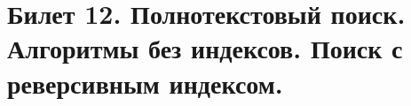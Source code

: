 \newpage
\section {Билет 12. Полнотекстовый поиск. Алгоритмы без индексов. Поиск с реверсивным индексом.}